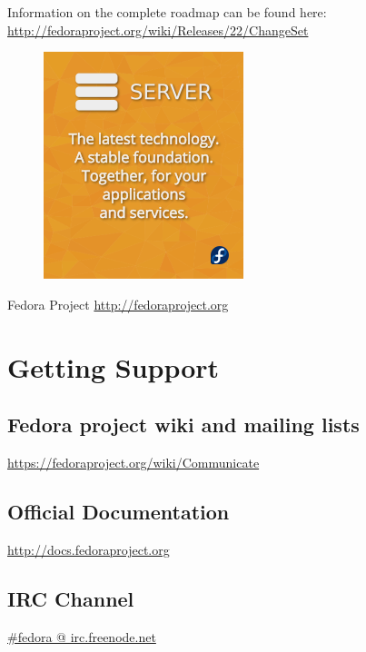 \documentclass[
notumble,
letterpaper,
10pt
]{leaflet}
\begin{document}
Information on the complete roadmap can be found here:\\ \href{http://fedoraproject.org/wiki/Releases/22/ChangeSet}{http://fedoraproject.org/wiki/Releases/22/ChangeSet}

\vspace{1.5cm}
\begin{figure}[h]
  \centering
  \includegraphics[keepaspectratio]{Fedora-server-v5a-infinity.png}
\end{figure}
\newpage

\begin{center}
  {\color{FedoraBlue}
  \LARGE{Fedora Project\vspace{1cm}}
  \Large{\href{http://fedoraproject.org}{http://fedoraproject.org}}
}
\end{center}

\section{\textcolor{FedoraBlue}{Getting Support}}
\subsection{Fedora project wiki and mailing lists}
\href{https://fedoraproject.org/wiki/Communicate}{https://fedoraproject.org/wiki/Communicate}

\subsection{Official Documentation}
\href{http://docs.fedoraproject.org}{http://docs.fedoraproject.org}

\subsection{IRC Channel}
\href{http://webchat.freenode.net/?channels=#fedora}{\#fedora @ irc.freenode.net}
\end{document}
